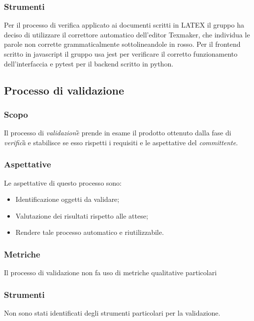 				\subsubsection{Strumenti}
				Per il processo di verifica applicato ai documenti scritti in LATEX il gruppo ha deciso di utilizzare il
				correttore automatico dell’editor Texmaker, che individua le parole non corrette grammaticalmente  sottolineandole in rosso.
				Per il frontend scritto in javascript il gruppo usa jest per verificare il corretto funzionamento dell'interfaccia 
				e pytest per il backend scritto in python.
		\subsection{Processo di validazione}
			\subsubsection{Scopo}
				Il processo di \emph{validazione}\G{} prende in esame il prodotto ottenuto dalla fase di \emph{verifica}\G{} e stabilisce se esso rispetti i requisiti e le aspettative del \emph{committente}.
			\subsubsection{Aspettative}
				Le aspettative di questo processo sono:
					\begin{itemize}
						\item Identificazione oggetti da validare;
						\item Valutazione dei risultati rispetto alle attese;
						\item Rendere tale processo automatico e riutilizzabile.
					\end{itemize}
			\subsubsection{Metriche}
			Il processo di validazione non fa uso di metriche qualitative particolari
			\subsubsection{Strumenti}
			Non sono stati identificati degli strumenti particolari per la validazione.
